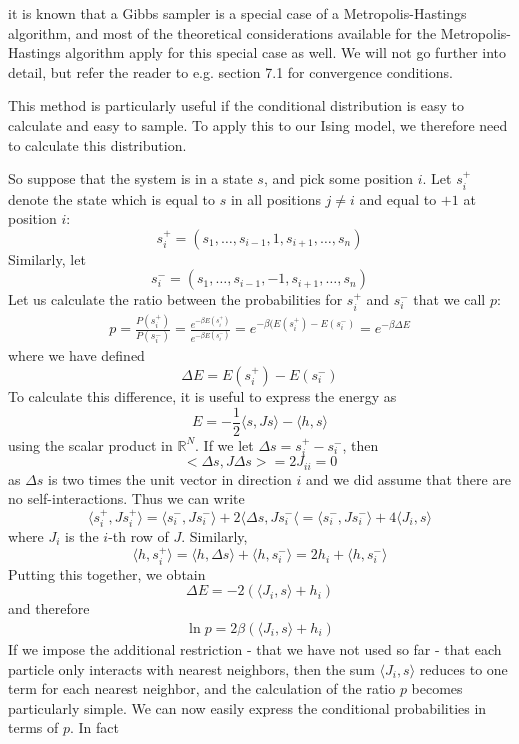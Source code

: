 \documentclass[a4paper, draft]{article}
\theoremstyle{own}
\theoremstyle{remark}
\newcommand{\R}{\mathbb{R}}
\begin{document}
it is known that a Gibbs sampler is a special case of a Metropolis-Hastings algorithm, and most of the theoretical considerations available for the Metropolis-Hastings algorithm apply for this special case as well. We will not go further into detail, but refer the reader to e.g. \cite{RobertCasella1999} section 7.1 for convergence conditions. 

This method is particularly useful if the conditional distribution is easy to calculate and easy to sample. To apply this to our Ising model, we therefore need to calculate this distribution.

So suppose that the system is in a state $s$, and pick some position $i$. Let $s_i^+$ denote the state which is equal to $s$ in all positions $j \neq i$ and equal to $+1$ at position $i$:
$$
s_i^+ = (s_1, \dots, s_{i-1}, 1, s_{i+1}, \dots, s_n)
$$
Similarly, let
$$
s_i^- = (s_1, \dots, s_{i-1}, -1, s_{i+1}, \dots, s_n)
$$
Let us calculate the ratio between the probabilities for $s_i^+$ and $s_i^-$ that we call $p$:
\begin{align*}
p = \frac{P(s_i^+)}{P(s_i^-)} = \frac{e^{-\beta E(s_i^+)}}{e^{-\beta E(s_i^-)}}
= e^{-\beta(E(s_i^+) - E(s_i^-)} = e^{-\beta \Delta E}
\end{align*}
where we have defined
$$
\Delta E = E(s_i^+) - E(s_i^-)
$$
To calculate this difference, it is useful to express the energy as
$$
E = - \frac{1}{2} \langle s, Js \rangle - \langle h,s \rangle
$$
using the scalar product in $\R^N$. If we let $\Delta s = s_i^+ - s_i^-$, then 
$$
<\Delta s , J \Delta s> = 2 J_{ii} = 0
$$
as $\Delta s$ is two times the unit vector in direction $i$ and we did assume that there are no self-interactions. Thus we can write
$$
\langle s_i^+, J s_i^+ \rangle = \langle s_i^-, J s_i^- \rangle 
+ 2 \langle \Delta s, J s_i^- \langle = \langle s_i^-, J s_i^- \rangle 
+ 4 \langle J_i, s \rangle
$$
where $J_i$ is the $i$-th row of $J$. Similarly,
$$
\langle h, s_i^+ \rangle = \langle h, \Delta s  \rangle + \langle h, s_i^- \rangle
= 2 h_i + \langle h, s_i^- \rangle
$$
Putting this together, we obtain
$$
\Delta E = - 2 ( \langle J_i, s \rangle + h_i)
$$
and therefore
\begin{align}\label{eq:gibbsprobabilityratio}
\ln p =  2\beta ( \langle J_i, s \rangle + h_i)
\end{align}
If we impose the additional restriction - that we have not used so far - that each particle only interacts with nearest neighbors, then the sum $\langle J_i, s \rangle$ reduces to one term for each nearest neighbor, and the calculation of the ratio $p$ becomes particularly simple. We can now easily express the conditional probabilities in terms of $p$. In fact
\end{document}
